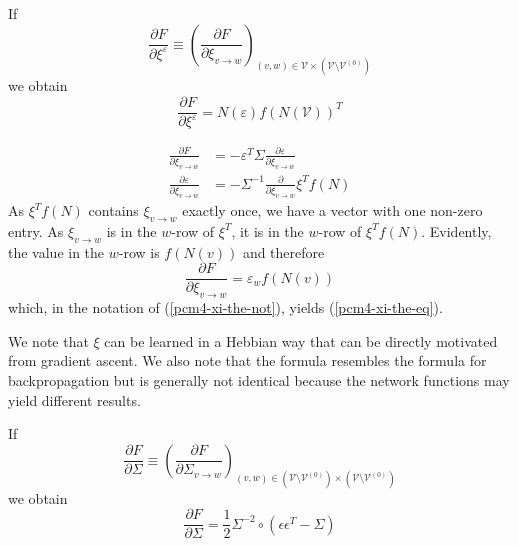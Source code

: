 \documentclass[a4paper,11pt]{article}
\begin{document}
\begin{The}[Learning $\xi$]\label{pcm4-xi-the}
If 
\begin{equation}\label{pcm4-xi-the-not}
\frac{\partial F}{\partial\xi^{\varepsilon}}\equiv\left(\frac{\partial F}{\partial\xi_{v\to w}}\right)_{(v,w)\in\mathcal{V}\times(\mathcal{V}\setminus\mathcal{V}^{(0)})}
\end{equation}
we obtain
\begin{equation}\label{pcm4-xi-the-eq}
\frac{\partial F}{\partial\xi^{\varepsilon}}=N(\varepsilon) f(N(\mathcal{V}))^T
\end{equation}
\end{The}
\begin{Bew}
\begin{align*}
\frac{\partial F}{\partial\xi_{v\to w}}&=-\varepsilon^T\Sigma\frac{\partial\varepsilon}{\partial\xi_{v\to w}}\\
\frac{\partial\varepsilon}{\partial\xi_{v\to w}}&=-\Sigma^{-1}\frac{\partial}{\partial\xi_{v\to w}}\xi^Tf(N)
\end{align*}
As $\xi^Tf(N)$ contains $\xi_{v\to w}$ exactly once, we have a vector with one non-zero entry. As $\xi_{v\to w}$ is in the $w$-row of $\xi^T$, it is in the $w$-row of $\xi^Tf(N)$. Evidently, the value in the $w$-row is $f(N(v))$ and therefore
\begin{equation}
\frac{\partial F}{\partial\xi_{v\to w}}=\varepsilon_wf(N(v))
\end{equation}
which, in the notation of (\ref{pcm4-xi-the-not}), yields (\ref{pcm4-xi-the-eq}).
\end{Bew}
\begin{Abs}
We note that $\xi$ can be learned in a Hebbian way that can be directly motivated from gradient ascent. We also note that the formula resembles the formula for backpropagation but is generally not identical because the network functions may yield different results.
\end{Abs}
\begin{Pro}\label{pcm4-sigma1-pro}
If
\begin{equation}\label{pcm4-sigma1-not}
\frac{\partial F}{\partial\Sigma}\equiv\left(\frac{\partial F}{\partial\Sigma_{v\to w}}\right)_{(v,w)\in(\mathcal{V}\setminus\mathcal{V}^{(0)})\times(\mathcal{V}\setminus\mathcal{V}^{(0)})}
\end{equation}
we obtain
\begin{equation}\label{pcm4-sigma1-eq}
\frac{\partial F}{\partial\Sigma}=\frac12\Sigma^{-2}\circ(\epsilon\epsilon^T-\Sigma)
\end{equation}
\end{Pro}
\end{document}
